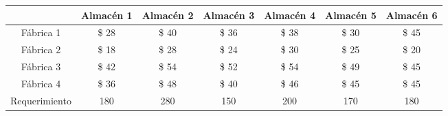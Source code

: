 \begin{tabular}{ccccccc}
       & Almacén 1 & Almacén 2 & Almacén 3 & Almacén 4 & Almacén 5 & Almacén 6 \bigstrut[b]\\
\hline
\hline
Fábrica 1 &  \$           28  &  \$            40  &  \$                36  &  \$           38  &  \$           30  &  \$           45  \bigstrut[t]\\
Fábrica 2 &  \$           18  &  \$            28  &  \$                24  &  \$           30  &  \$           25  &  \$           20  \\
Fábrica 3 &  \$           42  &  \$            54  &  \$                52  &  \$           54  &  \$           49  &  \$           45  \\
Fábrica 4 &  \$           36  &  \$            48  &  \$                40  &  \$           46  &  \$           45  &  \$           45  \bigstrut[b]\\
\hline
\hline
Requerimiento & 180    & 280    & 150    & 200    & 170    & 180 \bigstrut\\
\hline
\hline
\end{tabular}%
